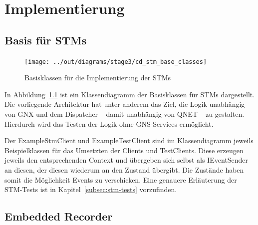 \chapter{Implementierung}\label{ch:implementierung}




\section{Basis für STMs}\label{sec:basis-fuer-stms}

\begin{figure}[h]
    \centering
    \texttt{[image: ../out/diagrams/stage3/cd\_stm\_base\_classes]}
    \caption{Basisklassen für die Implementierung der STMs}
    \label{fig:cd-stm-base}
\end{figure}

In Abbildung~\ref{fig:cd-stm-base} ist ein Klassendiagramm der Basisklassen für STMs dargestellt.
Die vorliegende Architektur hat unter anderem das Ziel, die Logik unabhängig von GNX und
dem Dispatcher – damit unabhängig von QNET – zu gestalten.
Hierdurch wird das Testen der Logik ohne GNS-Services ermöglicht.

Der ExampleStmClient und ExampleTestClient sind im Klassendiagramm jeweils Beispielklassen für
das Umsetzten der Clients und TestClients.
Diese erzeugen jeweils den entsprechenden Context und übergeben sich selbst als IEventSender an diesen,
der diesen wiederum an den Zustand übergibt.
Die Zustände haben somit die Möglichkeit Events zu verschicken.
Eine genauere Erläuterung der STM-Tests ist in Kapitel~\ref{subsec:stm-tests} vorzufinden.




\section{Embedded Recorder}\label{sec:embedded-recorder}


